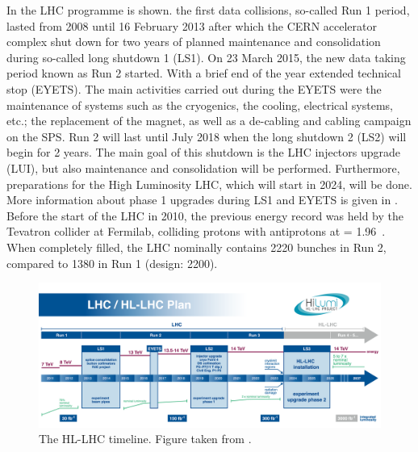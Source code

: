 In  the LHC programme is shown. the first data collisions, so-called Run 1 period, lasted from 2008 until 16 February 2013 after which  the CERN accelerator complex shut down for two years of planned maintenance and consolidation during so-called long shutdown 1 (LS1). On 23 March 2015, the new data taking period known as Run 2 started. With a brief end of the year extended technical stop (EYETS). The main activities carried out during the EYETS were the maintenance of systems such as the cryogenics, the cooling, electrical systems, etc.; the replacement of the magnet, as well as a de-cabling and cabling campaign on the SPS. Run 2 will last until July 2018 when the  long shutdown 2 (LS2) will begin for 2 years. The main goal of this shutdown is the LHC injectors upgrade (LUI), but also maintenance and consolidation will be performed. Furthermore, preparations for the High Luminosity LHC, which will start in 2024, will be done. More information about phase 1 upgrades during LS1 and EYETS is given in .\\ %
 Before the start of the LHC in 2010, the previous energy record was held by the Tevatron collider at Fermilab, colliding protons with antiprotons at \com = 1.96~\TeV.  When completely filled, the LHC nominally contains 2220 bunches in Run 2, compared to 1380 in Run 1 (design: 2200). 
\begin{figure}[htbp]
	\centering
	\includegraphics[width=1.\linewidth]{2_ExperimentalSetup/Figures/lhc_schedule}
	\caption{The HL-LHC timeline. Figure taken from \cite{Antonella:1975962}.}
	\label{fig:lhcschedule}
\end{figure}


